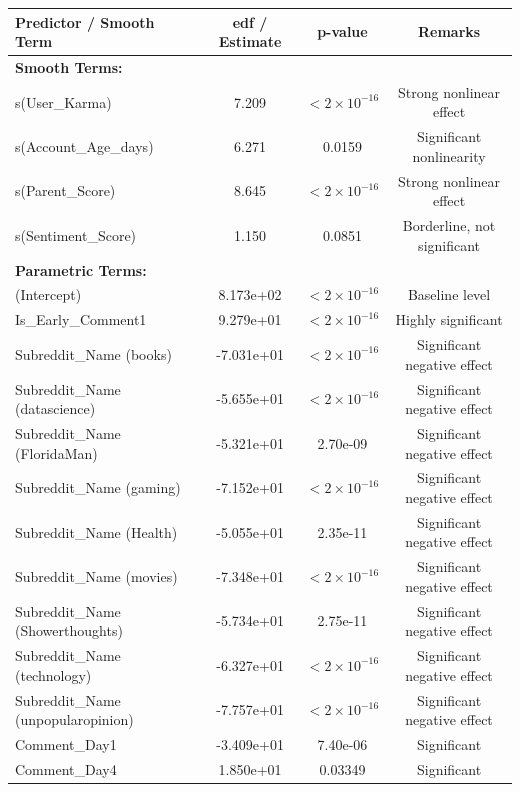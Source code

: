 \documentclass[10pt]{article}
\begin{document}
\begin{table}[H]
\centering
\small
\begin{tabular}{lccc}
\toprule
\textbf{Predictor / Smooth Term} & \textbf{edf / Estimate} & \textbf{p-value} & \textbf{Remarks} \\
\midrule
\multicolumn{4}{l}{\textbf{Smooth Terms:}} \\
s(User\_Karma)       & 7.209       & $<2\times10^{-16}$ & Strong nonlinear effect \\
s(Account\_Age\_days) & 6.271       & 0.0159             & Significant nonlinearity \\
s(Parent\_Score)     & 8.645       & $<2\times10^{-16}$ & Strong nonlinear effect \\
s(Sentiment\_Score)  & 1.150       & 0.0851             & Borderline, not significant \\
\midrule
\multicolumn{4}{l}{\textbf{Parametric Terms:}} \\
(Intercept)                     & 8.173e+02 & $<2\times10^{-16}$ & Baseline level \\
Is\_Early\_Comment1              & 9.279e+01  & $<2\times10^{-16}$ & Highly significant \\
Subreddit\_Name (books)          & -7.031e+01 & $<2\times10^{-16}$ & Significant negative effect \\
Subreddit\_Name (datascience)    & -5.655e+01 & $<2\times10^{-16}$ & Significant negative effect \\
Subreddit\_Name (FloridaMan)     & -5.321e+01 & 2.70e-09 & Significant negative effect \\
Subreddit\_Name (gaming)         & -7.152e+01 & $<2\times10^{-16}$ & Significant negative effect \\
Subreddit\_Name (Health)         & -5.055e+01 & 2.35e-11 & Significant negative effect \\
Subreddit\_Name (movies)         & -7.348e+01 & $<2\times10^{-16}$ & Significant negative effect \\
Subreddit\_Name (Showerthoughts) & -5.734e+01 & 2.75e-11 & Significant negative effect \\
Subreddit\_Name (technology)     & -6.327e+01 & $<2\times10^{-16}$ & Significant negative effect \\
Subreddit\_Name (unpopularopinion)& -7.757e+01 & $<2\times10^{-16}$ & Significant negative effect \\
Comment\_Day1                   & -3.409e+01 & 7.40e-06 & Significant \\
Comment\_Day4                   & 1.850e+01  & 0.03349 & Significant \\

\end{tabular}
\end{table}
\end{document}
